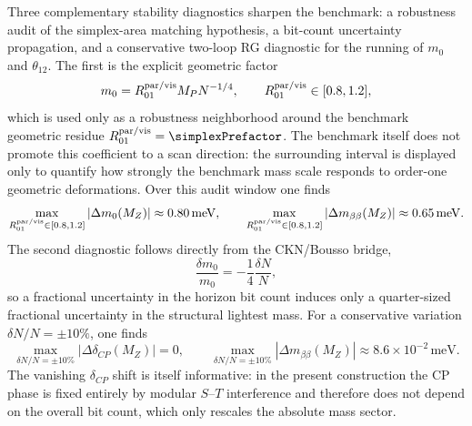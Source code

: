 \documentclass[11pt]{article}
\begin{document}
Three complementary stability diagnostics sharpen the benchmark: a robustness audit of the simplex-area matching hypothesis, a bit-count uncertainty propagation, and a conservative two-loop RG diagnostic for the running of $m_0$ and $\theta_{12}$. The first is the explicit geometric factor
\begin{equation}
 m_0 = R_{01}^{\rm par/vis} M_PN^{-1/4},
 \qquad
 R_{01}^{\rm par/vis}\in[0.8,1.2],
\end{equation}
which is used only as a robustness neighborhood around the benchmark geometric residue $R_{01}^{\rm par/vis}=\simplexPrefactor$. The benchmark itself does not promote this coefficient to a scan direction: the surrounding interval is displayed only to quantify how strongly the benchmark mass scale responds to order-one geometric deformations. Over this audit window one finds
\begin{equation}
 \max_{R_{01}^{\rm par/vis}\in[0.8,1.2]}|\Delta m_0(M_Z)|\approx 0.80\,\mathrm{meV},
 \qquad
 \max_{R_{01}^{\rm par/vis}\in[0.8,1.2]}|\Delta m_{\beta\beta}(M_Z)|\approx 0.65\,\mathrm{meV}.
\end{equation}
The second diagnostic follows directly from the CKN/Bousso bridge,
\begin{equation}
 \frac{\delta m_0}{m_0}
 = -\frac14\frac{\delta N}{N},
\end{equation}
so a fractional uncertainty in the horizon bit count induces only a quarter-sized fractional uncertainty in the structural lightest mass. For a conservative variation $\delta N/N=\pm10\%$, one finds
\begin{equation}
 \max_{\delta N/N=\pm10\%}|\Delta\delta_{CP}(M_Z)| = 0,
 \qquad
 \max_{\delta N/N=\pm10\%}|\Delta m_{\beta\beta}(M_Z)| \approx 8.6\times10^{-2}\,\mathrm{meV}.
\end{equation}
The vanishing $\delta_{CP}$ shift is itself informative: in the present construction the CP phase is fixed entirely by modular $S$--$T$ interference and therefore does not depend on the overall bit count, which only rescales the absolute mass sector.
\end{document}
